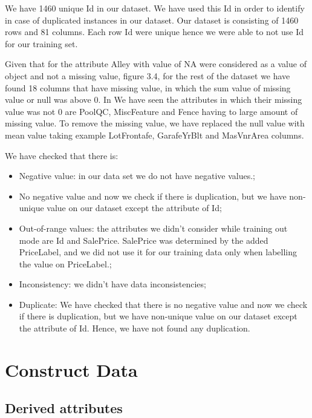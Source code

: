 We have 1460 unique Id in our dataset. We have used this Id in order to identify in case of duplicated instances in our dataset. Our dataset is consisting of 1460 rows and 81 columns. Each row Id were unique hence we were able to not use Id for our training set.

Given that for the attribute Alley with value of NA were considered as a value of object and not a missing value, figure 3.4, for the rest of the dataset we have found 18 columns that have missing value, in which the sum value of missing value or null was above 0. In We have seen the attributes in which their missing value was not 0 are PoolQC, MiscFeature and Fence having to large amount of missing value.
To remove the missing value, we have replaced the null value with mean value taking example LotFrontafe, GarafeYrBlt and MasVnrArea columns.

We have checked that there is:
\begin{itemize}
    \item Negative value: in our data set we do not have negative values.;
    \item No negative value and now we check if there is duplication, but we have non-unique value on our dataset except the attribute of Id;
    \item Out-of-range values: the attributes we didn’t consider while training out mode are Id and SalePrice. SalePrice was determined by the added PriceLabel, and we did not use it for our training data only when labelling the value on PriceLabel.;
    \item Inconsistency: we didn’t have data inconsistencies;
    \item Duplicate: We have checked that there is no negative value and now we check if there is duplication, but we have non-unique value on our dataset except the attribute of Id. Hence, we have not found any duplication.
\end{itemize}
     

\section{Construct Data}

\subsection{Derived attributes}

